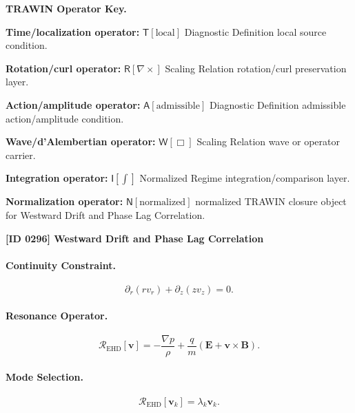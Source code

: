 \par\vspace{0.45\baselineskip}
\noindent\begin{minipage}[t]{\linewidth}
\begingroup
\small
\raggedright
\textbf{TRAWIN Operator Key.}\par
\noindent\textbf{Time/localization operator:} $\mathsf{T}\!\left[\mathrm{local}\right]$ Diagnostic Definition local source condition.\par
\noindent\textbf{Rotation/curl operator:} $\mathsf{R}\!\left[\nabla\times\right]$ Scaling Relation rotation/curl preservation layer.\par
\noindent\textbf{Action/amplitude operator:} $\mathsf{A}\!\left[\mathrm{admissible}\right]$ Diagnostic Definition admissible action/amplitude condition.\par
\noindent\textbf{Wave/d'Alembertian operator:} $\mathsf{W}\!\left[\Box\right]$ Scaling Relation wave or operator carrier.\par
\noindent\textbf{Integration operator:} $\mathsf{I}\!\left[\int\right]$ Normalized Regime integration/comparison layer.\par
\noindent\textbf{Normalization operator:} $\mathsf{N}\!\left[\mathrm{normalized}\right]$ normalized TRAWIN closure object for Westward Drift and Phase Lag Correlation.\par
\endgroup
\end{minipage}

\clearpage
\noindent\textbf{[ID 0296] Westward Drift and Phase Lag Correlation}\par
\vspace{0.35em}
\paragraph{Continuity Constraint.}
\begin{equation}
\partial_r(rv_r)+\partial_z(zv_z)=0.
\end{equation}

\paragraph{Resonance Operator.}
\begin{equation}
\mathcal{R}_{\mathrm{EHD}}[\mathbf{v}]
=
-\frac{\nabla p}{\rho}
+
\frac{q}{m}
(\mathbf{E}+\mathbf{v}\times\mathbf{B}).
\end{equation}

\paragraph{Mode Selection.}
\begin{equation}
\mathcal{R}_{\mathrm{EHD}}[\mathbf{v}_k]
=
\lambda_k\mathbf{v}_k.
\end{equation}


